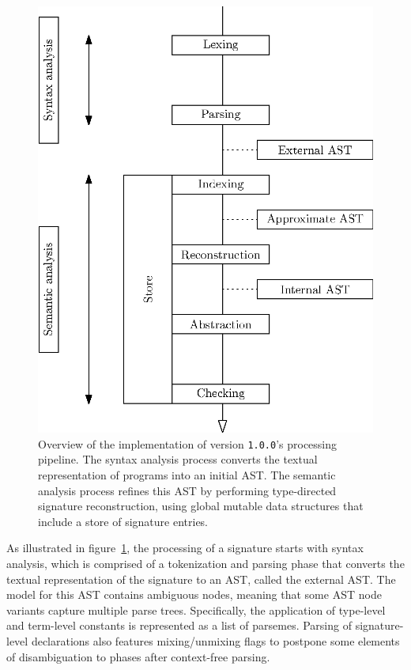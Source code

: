 \begin{figure}
\centering
\includegraphics{figures/legacy-beluga-processing-pipeline.eps}
\caption[Overview of the implementation of \Beluga version \texttt{1.0.0}'s processing pipeline.]{%
Overview of the implementation of \Beluga version \texttt{1.0.0}'s processing pipeline.
The syntax analysis process converts the textual representation of \Beluga programs into an initial \acs{AST}.
The semantic analysis process refines this \acs{AST} by performing type-directed signature reconstruction, using global mutable data structures that include a store of signature entries.
}
\label{figure:legacy-beluga-processing-pipeline}
\end{figure}

As illustrated in figure~\ref{figure:legacy-beluga-processing-pipeline}, the processing of a \Beluga signature starts with syntax analysis, which is comprised of a tokenization and parsing phase that converts the textual representation of the signature to an \ac{AST}, called the external \ac{AST}.
The model for this \ac{AST} contains ambiguous nodes, meaning that some \ac{AST} node variants capture multiple parse trees.
Specifically, the application of \LF type-level and term-level constants is represented as a list of parsemes.
Parsing of signature-level declarations also features mixing/unmixing flags to postpone some elements of disambiguation to phases after context-free parsing.

